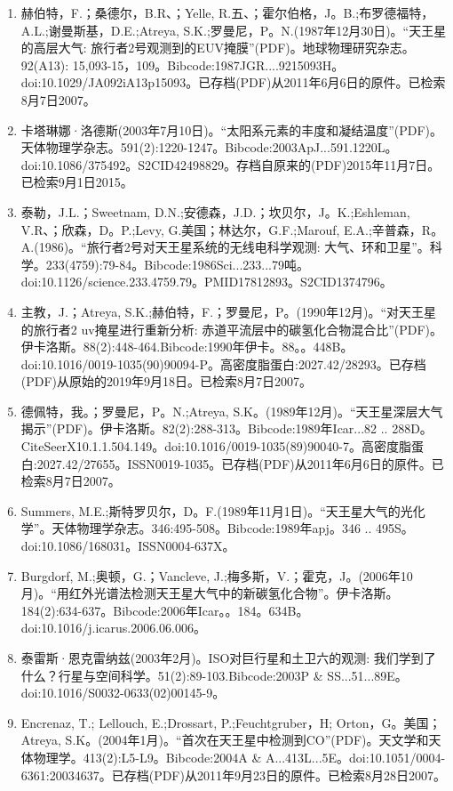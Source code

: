 \begin{enumerate}
\item 赫伯特，F.；桑德尔，B.R、；Yelle, R.五、；霍尔伯格，J。B.;布罗德福特，A.L.;谢曼斯基，D.E.;Atreya, S.K.;罗曼尼，P。N.(1987年12月30日)。“天王星的高层大气: 旅行者2号观测到的EUV掩膜”(PDF)。地球物理研究杂志。92(A13): 15,093-15，109。Bibcode:1987JGR....9215093H。doi:10.1029/JA092iA13p15093。已存档(PDF)从2011年6月6日的原件。已检索8月7日2007。
\item 卡塔琳娜·洛德斯(2003年7月10日)。“太阳系元素的丰度和凝结温度”(PDF)。天体物理学杂志。591(2):1220-1247。Bibcode:2003ApJ...591.1220L。doi:10.1086/375492。S2CID42498829。存档自原来的(PDF)2015年11月7日。已检索9月1日2015。  
\item 泰勒，J.L.；Sweetnam, D.N.;安德森，J.D.；坎贝尔，J。K.;Eshleman, V.R、；欣森，D。P.;Levy, G.美国；林达尔，G.F.;Marouf, E.A.;辛普森，R。A.(1986)。“旅行者2号对天王星系统的无线电科学观测: 大气、环和卫星”。科学。233(4759):79-84。Bibcode:1986Sci...233...79吨。doi:10.1126/science.233.4759.79。PMID17812893。S2CID1374796。   
\item 主教，J.；Atreya, S.K.;赫伯特，F.；罗曼尼，P。(1990年12月)。“对天王星的旅行者2 uv掩星进行重新分析: 赤道平流层中的碳氢化合物混合比”(PDF)。伊卡洛斯。88(2):448-464.Bibcode:1990年伊卡。88。。448B。doi:10.1016/0019-1035(90)90094-P。高密度脂蛋白:2027.42/28293。已存档(PDF)从原始的2019年9月18日。已检索8月7日2007。
\item 德佩特，我。；罗曼尼，P。N.;Atreya, S.K。(1989年12月)。“天王星深层大气揭示”(PDF)。伊卡洛斯。82(2):288-313。Bibcode:1989年Icar...82 .. 288D。CiteSeerX10.1.1.504.149。doi:10.1016/0019-1035(89)90040-7。高密度脂蛋白:2027.42/27655。ISSN0019-1035。已存档(PDF)从2011年6月6日的原件。已检索8月7日2007。   
\item Summers, M.E.;斯特罗贝尔，D。F.(1989年11月1日)。“天王星大气的光化学”。天体物理学杂志。346:495-508。Bibcode:1989年apj。346 .. 495S。doi:10.1086/168031。ISSN0004-637X。  
\item Burgdorf, M.;奥顿，G.；Vancleve, J.;梅多斯，V.；霍克，J。(2006年10月)。“用红外光谱法检测天王星大气中的新碳氢化合物”。伊卡洛斯。184(2):634-637。Bibcode:2006年Icar。。184。634B。doi:10.1016/j.icarus.2006.06.006。
\item 泰雷斯·恩克雷纳兹(2003年2月)。ISO对巨行星和土卫六的观测: 我们学到了什么？行星与空间科学。51(2):89-103.Bibcode:2003P & SS...51...89E。doi:10.1016/S0032-0633(02)00145-9。
\item Encrenaz, T.; Lellouch, E.;Drossart, P.;Feuchtgruber，H; Orton，G。美国；Atreya, S.K。(2004年1月)。“首次在天王星中检测到CO”(PDF)。天文学和天体物理学。413(2):L5-L9。Bibcode:2004A & A...413L...5E。doi:10.1051/0004-6361:20034637。已存档(PDF)从2011年9月23日的原件。已检索8月28日2007。

\end{enumerate}
